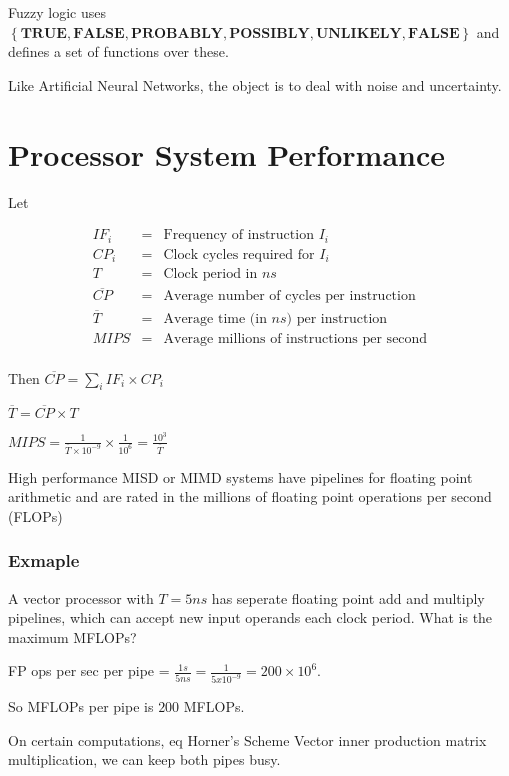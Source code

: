 \documentclass[a4paper,12pt]{article}
\begin{document}
Fuzzy logic uses $\left\{ \textbf{TRUE}, \textbf{FALSE}, \textbf{PROBABLY},
\textbf{POSSIBLY}, \textbf{UNLIKELY}, \textbf{FALSE} \right\}$ and defines a set
of functions over these.

Like Artificial Neural Networks, the object is to deal with noise and
uncertainty.

\section*{Processor System Performance}

Let

\begin{eqnarray*}
IF_{i}			&	=	&	\mbox{Frequency of instruction } I_{i}					\\
CP_{i}			&	=	&	\mbox{Clock cycles required for }I_{i}					\\ 
T					&	=	&	\mbox{Clock period in } ns									\\
\overline{CP}	&	=	&	\mbox{Average number of cycles per instruction}		\\
\overline{T}	&	=	&	\mbox{Average time (in $ns$) per instruction} 		\\
MIPS				&	=	&	\mbox{Average millions of instructions per second} \\
\end{eqnarray*}

Then $\overline{CP} = \sum_{i} IF_{i} \times CP_{i}$

$\overline{T} = \overline{CP} \times T $

$MIPS = \frac{1}{\overline{T} \times 10^{-9}} \times \frac{1}{10^{6}} =
\frac{10^{3}}{\overline{T}}$


High performance MISD or MIMD systems have pipelines for floating point
arithmetic and are rated in the millions of floating point operations
per second (FLOPs)

\subsubsection*{Exmaple}

A vector processor with $T = 5ns$ has seperate floating point add and
multiply pipelines, which can accept new input operands each clock
period. What is the maximum MFLOPs?

FP ops per sec per pipe = $\frac{1 s}{5ns} = \frac{1}{5 x 10^{-9}} = 200 \times 10^{6}$.

So MFLOPs per pipe is $200$ MFLOPs.

On certain computations, eq Horner's Scheme Vector inner production
matrix multiplication, we can keep both pipes busy.
\end{document}
